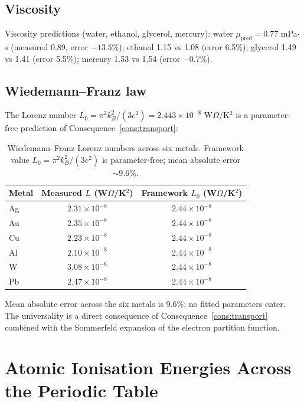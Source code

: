 \subsection{Viscosity}

Viscosity predictions (water, ethanol, glycerol, mercury):
water $\mu_{\text{pred}}=0.77$ mPa$\cdot$s (measured 0.89, error $-13.5$\%);
ethanol 1.15 vs 1.08 (error 6.5\%);
glycerol 1.49 vs 1.41 (error 5.5\%);
mercury 1.53 vs 1.54 (error $-0.7$\%).

\subsection{Wiedemann--Franz law}

The Lorenz number $L_0=\pi^{2}k_B^{2}/(3e^{2})=2.443\times 10^{-8}$
W$\Omega$/K$^{2}$ is a parameter-free prediction of
Consequence~\ref{cons:transport}:

\begin{table}[htbp]
\centering
\caption{Wiedemann--Franz Lorenz numbers across six metals.
Framework value $L_0=\pi^{2}k_B^{2}/(3e^{2})$ is parameter-free;
mean absolute error $\sim 9.6$\%.}
\label{tab:wiedemannfranz}
\begin{tabular}{@{}lcc@{}}
\toprule
Metal & Measured $L$ (W$\Omega$/K$^{2}$) &
  Framework $L_0$ (W$\Omega$/K$^{2}$) \\
\midrule
Ag & $2.31\times 10^{-8}$ & $2.44\times 10^{-8}$ \\
Au & $2.35\times 10^{-8}$ & $2.44\times 10^{-8}$ \\
Cu & $2.23\times 10^{-8}$ & $2.44\times 10^{-8}$ \\
Al & $2.10\times 10^{-8}$ & $2.44\times 10^{-8}$ \\
W  & $3.08\times 10^{-8}$ & $2.44\times 10^{-8}$ \\
Pb & $2.47\times 10^{-8}$ & $2.44\times 10^{-8}$ \\
\bottomrule
\end{tabular}
\end{table}

Mean absolute error across the six metals is 9.6\%; no fitted parameters
enter.  The universality is a direct consequence of Consequence~\ref{cons:transport}
combined with the Sommerfeld expansion of the electron partition function.

\section{Atomic Ionisation Energies Across the Periodic Table}
\label{sec:ionisation-ch25}
\label{sec:atomicspectra}

